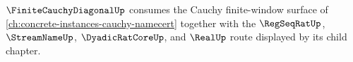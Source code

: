 $\FiniteCauchyDiagonalUp$ consumes the Cauchy finite-window surface of \autoref{ch:concrete-instances-cauchy-namecert} together with the $\RegSeqRatUp$, $\StreamNameUp$, $\DyadicRatCoreUp$, and $\RealUp$ route displayed by its child chapter.

